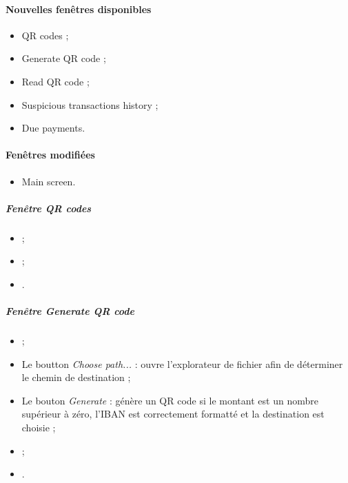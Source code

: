 \paragraph{Nouvelles fenêtres disponibles}
\begin{itemize}
\item QR codes ;
\item Generate QR code ;
\item Read QR code ;
\item Suspicious transactions history ;
\item Due payments.
\end{itemize}

\paragraph{Fenêtres modifiées}
\begin{itemize}
\item Main screen. %
\end{itemize}


\subparagraph{Fenêtre \emph{QR codes}}
\begin{itemize}
\item {} ;
\item {} ;
\item {}.
\end{itemize}


\subparagraph{Fenêtre \emph{Generate QR code}}
\begin{itemize}
\item {} ;
\item Le boutton \emph{Choose path...} : ouvre l'explorateur de fichier afin de déterminer le chemin de destination ;
\item Le bouton \emph{Generate} : génère un QR code si le montant est un nombre supérieur à zéro, l'IBAN est correctement formatté et la destination est choisie ;
\item {} ;
\item {}.
\end{itemize}


